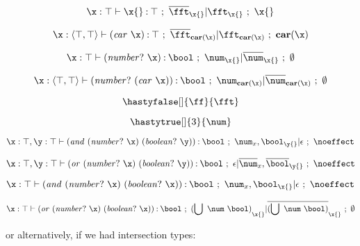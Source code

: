 \documentclass{article}[12pt]
\begin{document}
\newcommand{\cand}[2]{\comb{\andsym}{{#1}\ {#2}}}
\newcommand{\cor}[2]{\comb{\orsym}{{#1}\ {#2}}}

\newcommand{\numbool}{{(\usym\ \num\ \bool)}}
\newcommand{\inumbool}{{(\isym\ \num\ \bool)}}


\begin{displaymath}
  \hastyvar[\xenvtop]{\x{}}{\top}{\x{}}
\end{displaymath}

\begin{displaymath}
  \hastyvar[{\xenv{\consty{\top}{\top}}{}}]{\carx{}}{\top}{\pecarx{}}
\end{displaymath}

\begin{displaymath}
  \hastypred [\xenvtop] {\numpx} {\num} {\x{}}
\end{displaymath}

\begin{displaymath}
  \hastypred [\xenv{\consty{\top}{\top}}] {\nump{\carx}} {\num} {\pecarx}
\end{displaymath}

\begin{displaymath}
  \hastyfalse[\empty]{\ff}{\fft}
\end{displaymath}

\begin{displaymath}
  \hastytrue[\empty]{3}{\num}
\end{displaymath}

\begin{displaymath}
  \hastyeff[\xyenv] {\cand{\numpx}{\boolpy}} {\bool} {\num_{x{}},\bool_{\y{}}}  {\bullet} {\noeffect}
\end{displaymath}

\begin{displaymath}
  \hastyeff[\xyenv] {\cor{\numpx}{\boolpy}} {\bool} {\bullet} {\comp{\num}_{x{}},\comp{\bool}_{\y{}}}  {\noeffect}
\end{displaymath}

\begin{displaymath}
  \hastyeff[\xenvtop] {\cand{\numpx}{\boolpx}} {\bool} {\num_{x{}},\bool_{\x{}}}  {\bullet} {\noeffect}
\end{displaymath}

\begin{displaymath}
  \hastypred[\xenvtop] {\cor{\numpx}{\boolpx}} {\numbool} {\x{}}
\end{displaymath}

or alternatively, if we had intersection types:
\end{document}
